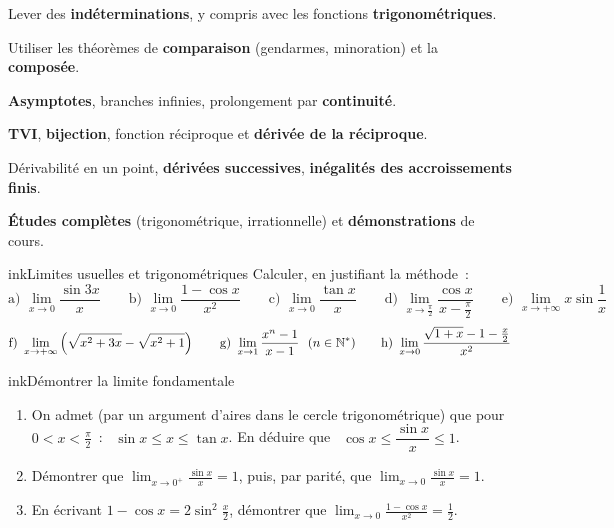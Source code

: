 \def\piedfiche{TD n°1 · Terminale S1}



\begin{competences}
  \item Lever des \textbf{indéterminations}, y compris avec les fonctions \textbf{trigonométriques}.
  \item Utiliser les théorèmes de \textbf{comparaison} (gendarmes, minoration) et la \textbf{composée}.
  \item \textbf{Asymptotes}, branches infinies, prolongement par \textbf{continuité}.
  \item \textbf{TVI}, \textbf{bijection}, fonction réciproque et \textbf{dérivée de la réciproque}.
  \item Dérivabilité en un point, \textbf{dérivées successives}, \textbf{inégalités des accroissements finis}.
  \item \textbf{Études complètes} (trigonométrique, irrationnelle) et \textbf{démonstrations} de cours.
\end{competences}


\begin{exo}{ink}{Limites usuelles et trigonométriques }
Calculer, en justifiant la méthode~:
\[
\text{a) } \lim_{x\to0}\frac{\sin 3x}{x} \qquad
\text{b) } \lim_{x\to0}\frac{1-\cos x}{x^2} \qquad
\text{c) } \lim_{x\to0}\frac{\tan x}{x} \qquad
\text{d) } \lim_{x\to\frac\pi2}\frac{\cos x}{x-\frac\pi2} \qquad
\text{e) } \lim_{x\to+\infty}x\sin\frac1x
\]
\[
\text{f) } \lim_{x\to+\infty}\left(\sqrt{x^2+3x}-\sqrt{x^2+1}\right) \qquad
\text{g) } \lim_{x\to1}\frac{x^n-1}{x-1}\ \ (n\in\mathbb{N}^*) \qquad
\text{h) } \lim_{x\to0}\frac{\sqrt{1+x}-1-\frac x2}{x^2}
\]
\end{exo}

\begin{exo}{ink}{Démontrer la limite fondamentale \demo\ }
\begin{enumerate}
  \item On admet (par un argument d'aires dans le cercle trigonométrique) que pour $0<x<\frac\pi2$~: \ $\sin x\leq x\leq\tan x$. En déduire que \ $\cos x\leq\dfrac{\sin x}{x}\leq1$.
  \item Démontrer que $\displaystyle\lim_{x\to0^+}\frac{\sin x}{x}=1$, puis, par parité, que $\displaystyle\lim_{x\to0}\frac{\sin x}{x}=1$.
  \item En écrivant $1-\cos x=2\sin^2\frac x2$, démontrer que $\displaystyle\lim_{x\to0}\frac{1-\cos x}{x^2}=\frac12$.
\end{enumerate}
\end{exo}

